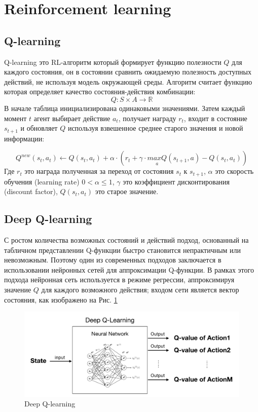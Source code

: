 \documentclass{letask}
\begin{document}
\section{Reinforcement learning}
\subsection{Q-learning}
Q-learning это RL-алгоритм который формирует функцию полезности $Q$ для каждого состояния, он в состоянии сравнить ожидаемую полезность доступных действий, не используя модель окружающей среды. Алгоритм считает функцию которая определяет качество состояния-действия комбинации:
\begin{equation}
Q : S \times A \rightarrow \mathbb{R}
\end{equation}
В начале таблица инициализирована одинаковыми значениями. Затем каждый момент $t$ агент выбирает действие $a_t$, получает награду $r_t$, входит в состояние $s_{t+1}$ и обновляет $Q$ используя взвешенное среднее старого значения и новой информации:

\begin{equation}
Q^{new}(s_t,a_t) \leftarrow Q(s_t,a_t)+ \alpha \cdot (r_t + \gamma \cdot \underset{a}{maxQ}(s_{t+1},a)-Q(s_t,a_t))
\end{equation}
Где $r_t$ это награда полученная за переход от состояния $s_t$ к $s_{t+1}$, $\alpha$ это скорость обучения (learning rate) $0<\alpha \leq 1$, $\gamma$ это коэффициент дисконтирования (discount factor), $Q(s_t,a_t)$ это старое значение.

\subsection{Deep Q-learning}
С ростом количества возможных состояний и действий подход, основанный на табличном представлении Q-функции быстро становится непрактичным или невозможным. Поэтому один из современных подходов заключается в использовании нейронных сетей для аппроксимации Q-функции. В рамках этого подхода нейронная сеть используется в режиме регрессии, аппроксимируя значение $Q$ для каждого возможного действия; входом сети является вектор состояния, как изображено на Рис. \ref{deep_q_learning}

\begin{figure}[h]
\centering
\includegraphics[scale=0.32]{deep_q_learning.png}
\caption{Deep Q-learning}
\label{deep_q_learning}
\end{figure}
\end{document}

